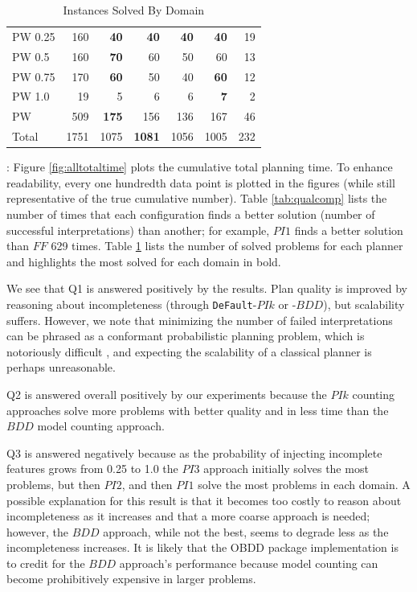 \documentclass[letterpaper]{article}
\def\und#1{\noindent{\bf #1}:}
\def\default{{\tt DeFault}}
\def\citep#1{\cite{#1}}
\begin{document}
\begin{table}[t]
\begin{tabular}{|l|r|r@{ }r@{ }r@{ }r|r|}
PW 0.25 	&		160		&	{\bf	40}	&	{\bf	40}	&	{\bf	40}	&	{\bf	40}	&	19	\\	
PW 0.5 	&		160		&	{\bf	70}	&		60		&		50		&		60		&	13	\\	
PW 0.75 	&		170		&	{\bf	60}	&		50		&		40		&	{\bf	60}	&	12	\\	
PW 1.0 	&		19		&		5		&		6		&		6		&	{\bf	7}	&	2	\\	\hline
PW 	&		509		&	{\bf	175}	&		156		&		136		&		167		&	46	\\	\hline\hline
Total	&		1751		&		1075		&	{\bf	1081}	&		1056		&		1005		&	232	\\	
\hline																								
\end{tabular}	\caption{\label{tab:solved} Instances Solved By Domain}																							
\end{table}																																												



\und{Off-line Planning Results} Figure \ref{fig:alltotaltime} plots the
 cumulative total planning time.  To enhance readability, every one
hundredth data point is plotted in the figures (while still representative of
the true cumulative number).  Table \ref{tab:qualcomp} lists the number of times
that each configuration finds a better solution (number of successful
interpretations) than another; for example, $PI1$ finds a better solution than
$FF$ 629 times. Table \ref{tab:solved} lists the number of solved problems for
each planner and highlights the most solved for each domain in bold.

We see that Q1 is answered positively by the results.  Plan quality is
improved by reasoning about incompleteness (through \default{}-$PIk$ or -$BDD$),
but scalability suffers.  However, we note that minimizing the number of failed
interpretations  can be phrased as a conformant probabilistic
planning problem, which is notoriously difficult \citep{pff,aij-mclug}, and
expecting the scalability of a classical planner is perhaps  unreasonable.

Q2 is answered overall positively by our experiments because the $PIk$ counting
approaches solve more problems with better quality and in less time than the
$BDD$ model counting approach.  

Q3 is answered negatively because as the probability of injecting incomplete
features grows from 0.25 to 1.0 the $PI3$ approach initially solves the most
problems, but then $PI2$, and then $PI1$ solve the most problems in each domain.
A possible explanation for this result is that it becomes too costly to reason
about incompleteness as it increases and that a more coarse approach is needed;
however, the $BDD$ approach, while not the best, seems to degrade less as the
incompleteness increases.  It is likely that the OBDD package 
implementation \citep{jdd} is to credit for the $BDD$ approach's performance
because model counting can become prohibitively expensive in larger problems.
\end{document}
